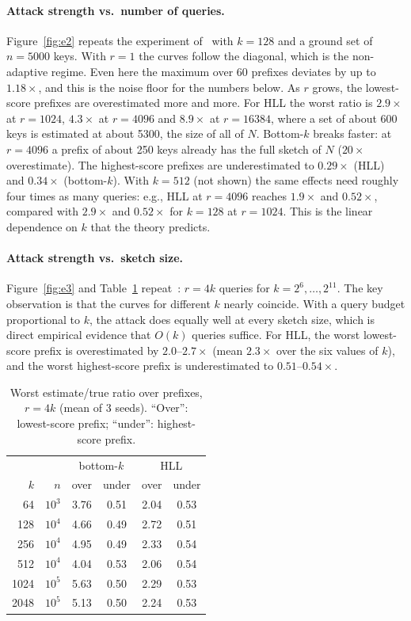 \documentclass{cccg20}
\begin{document}
\paragraph{Attack strength vs.\ number of queries.}
Figure~\ref{fig:e2} repeats the experiment of~\cite[Figs.~1--2]{ahmadian2024} with $k=128$ and a ground set of $n=5000$ keys. With $r=1$ the curves follow the diagonal, which is the non-adaptive regime. Even here the maximum over 60 prefixes deviates by up to $1.18\times$, and this is the noise floor for the numbers below. As $r$ grows, the lowest-score prefixes are overestimated more and more. For HLL the worst ratio is $2.9\times$ at $r=1024$, $4.3\times$ at $r=4096$ and $8.9\times$ at $r=16384$, where a set of about 600 keys is estimated at about 5300, the size of all of $N$. Bottom-$k$ breaks faster: at $r=4096$ a prefix of about 250 keys already has the full sketch of $N$ ($20\times$ overestimate). The highest-score prefixes are underestimated to $0.29\times$ (HLL) and $0.34\times$ (bottom-$k$). With $k=512$ (not shown) the same effects need roughly four times as many queries: e.g., HLL at $r=4096$ reaches $1.9\times$ and $0.52\times$, compared with $2.9\times$ and $0.52\times$ for $k=128$ at $r=1024$. This is the linear dependence on $k$ that the theory predicts.

\paragraph{Attack strength vs.\ sketch size.}
Figure~\ref{fig:e3} and Table~\ref{tab:e3} repeat~\cite[Fig.~3]{ahmadian2024}: $r=4k$ queries for $k=2^6,\dots,2^{11}$. The key observation is that the curves for different $k$ nearly coincide. With a query budget proportional to $k$, the attack does equally well at every sketch size, which is direct empirical evidence that $O(k)$ queries suffice. For HLL, the worst lowest-score prefix is overestimated by $2.0$--$2.7\times$ (mean $2.3\times$ over the six values of $k$), and the worst highest-score prefix is underestimated to $0.51$--$0.54\times$.

\begin{table}[t]
\centering\small
\begin{tabular}{rrcccc}
\toprule
 & & \multicolumn{2}{c}{bottom-$k$} & \multicolumn{2}{c}{HLL}\\
$k$ & $n$ & over & under & over & under\\
\midrule
64   & $10^3$ & 3.76 & 0.51 & 2.04 & 0.53\\
128  & $10^4$ & 4.66 & 0.49 & 2.72 & 0.51\\
256  & $10^4$ & 4.95 & 0.49 & 2.33 & 0.54\\
512  & $10^4$ & 4.04 & 0.53 & 2.06 & 0.54\\
1024 & $10^5$ & 5.63 & 0.50 & 2.29 & 0.53\\
2048 & $10^5$ & 5.13 & 0.50 & 2.24 & 0.53\\
\bottomrule
\end{tabular}
\caption{Worst estimate/true ratio over prefixes, $r=4k$ (mean of 3 seeds). ``Over'': lowest-score prefix; ``under'': highest-score prefix.}
\label{tab:e3}
\end{table}
\end{document}
